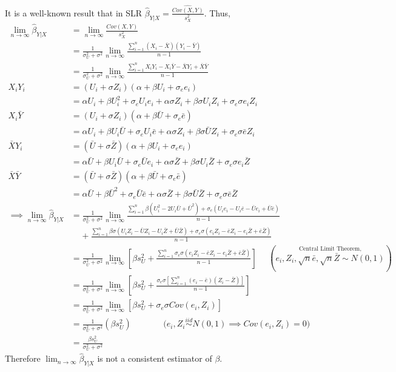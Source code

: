 \documentclass[
  letterpaper,
  DIV=11,
  numbers=noendperiod]{scrreprt}
\begin{document}
It is a well-known result that in SLR
\(\hat{\beta}_{Y|X}= \frac{\widehat{Cov(X,Y)}}{s^2_X}\). Thus,
\[ \begin{aligned}
\lim_{n \to \infty}\hat{\beta}_{Y|X} &= \lim_{n \to \infty} \frac{Cov(X,Y)}{s^2_X} \\
&= \frac{1}{\sigma_U^2+ \sigma^2} \lim_{n \to \infty} \frac{\sum_{i=1}^n(X_i-\bar X)(Y_i-\bar Y)}{n-1} \\
&= \frac{1}{\sigma_U^2+ \sigma^2} \lim_{n \to \infty} \frac{\sum_{i=1}^nX_iY_i-X_i\bar Y-\bar XY_i+\bar X\bar Y}{n-1} \\
X_iY_i &= (U_i + \sigma Z_i)(\alpha + \beta U_i +\sigma_e e_i) \\
&= \alpha U_i + \beta U_i^2 +\sigma_e U_ie_i +\alpha \sigma Z_i+ \beta \sigma U_i Z_i +\sigma_e\sigma e_i Z_i \\
X_i\bar Y &= (U_i + \sigma Z_i)(\alpha + \beta \bar U +\sigma_e \bar e) \\
&= \alpha U_i + \beta U_i \bar U +\sigma_e U_i \bar e +\alpha \sigma Z_i+ \beta \sigma \bar U Z_i +\sigma_e\sigma \bar e Z_i \\
\bar XY_i &= (\bar U + \sigma \bar Z)(\alpha + \beta U_i +\sigma_e e_i) \\
&= \alpha \bar U + \beta U_i \bar U +\sigma_e \bar Ue_i +\alpha \sigma \bar Z+ \beta \sigma U_i \bar Z +\sigma_e\sigma e_i \bar Z \\
\bar X \bar Y &= (\bar U + \sigma \bar Z)(\alpha + \beta \bar U +\sigma_e \bar e) \\
&= \alpha \bar U + \beta \bar U^2 +\sigma_e \bar U \bar e +\alpha \sigma \bar Z+ \beta \sigma \bar U \bar Z +\sigma_e\sigma \bar e \bar Z \\
\implies \lim_{n \to \infty}\hat{\beta}_{Y|X} &= \frac{1}{\sigma_U^2+ \sigma^2} \lim_{n \to \infty} \frac{\sum_{i=1}^n \beta (U_i^2-2 U_i\bar U +\bar U^2)+\sigma_e(U_i e_i -U_i \bar e -\bar U e_i + \bar U \bar e)}{n-1} \\
&~~~~~+\frac{\sum_{i=1}^n \beta \sigma (U_iZ_i- \bar U Z_i - U_i \bar Z +\bar U \bar Z)+\sigma_e \sigma(e_i Z_i -\bar e Z_i - e_i\bar Z + \bar e\bar Z )}{n-1}  \\
&= \frac{1}{\sigma_U^2+ \sigma^2} \lim_{n \to \infty} \left[ \beta s_U^2+\frac{\sum_{i=1}^n \sigma_e \sigma(e_i Z_i -\bar e Z_i - e_i\bar Z + \bar e\bar Z )}{n-1} \right] ~~~~~~ \left( \overset{\text{Central Limit Theorem,}}{e_i,Z_i, \sqrt n \bar e, \sqrt n \bar Z \sim N(0,1)} \right) \\
&= \frac{1}{\sigma_U^2+ \sigma^2} \lim_{n \to \infty} \left[ \beta s_U^2+\frac{\sigma_e \sigma \left[\sum_{i=1}^n (e_i - \bar e) (Z_i- \bar Z)\right]}{n-1} \right]\\
&= \frac{1}{\sigma_U^2+ \sigma^2} \lim_{n \to \infty} \left[ \beta s_U^2+\sigma_e \sigma Cov(e_i,Z_i) \right] \\
&= \frac{1}{\sigma_U^2+ \sigma^2}(\beta s_U^2)~~~~~~~~~~~~~~~~~\bigg(e_i,Z_i \overset{iid}{\sim} N(0,1) \implies Cov(e_i,Z_i) =0 \bigg) \\
&= \frac{\beta s_U^2}{\sigma_U^2+ \sigma^2}
\end{aligned}
\] Therefore \(\lim_{n \to \infty}\hat{\beta}_{Y|X}\) is not a
consistent estimator of \(\beta\).
\end{document}
